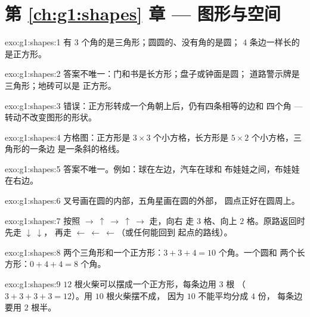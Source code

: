 \section*{第 \ref{ch:g1:shapes} 章 --- 图形与空间}

\begin{solution}{exo:g1:shapes:1}
有 $3$ 个角的是三角形；圆圆的、没有角的是圆；
$4$ 条边一样长的是正方形。
\end{solution}

\begin{solution}{exo:g1:shapes:2}
答案不唯一：门和书是长方形；盘子或钟面是圆；
道路警示牌是三角形；地砖可以是
正方形。
\end{solution}

\begin{solution}{exo:g1:shapes:3}
错误：正方形转成一个角朝上后，仍有四条相等的边和
四个角 --- 转动不改变图形的形状。
\end{solution}

\begin{solution}{exo:g1:shapes:4}
方格图：正方形是 $3 \times 3$ 个小方格，长方形是
$5 \times 2$ 个小方格，三角形的一条边
是一条斜的格线。
\end{solution}

\begin{solution}{exo:g1:shapes:5}
答案不唯一。例如：球在左边，汽车在球和
布娃娃之间，布娃娃在右边。
\end{solution}

\begin{solution}{exo:g1:shapes:6}
叉号画在圆的内部，五角星画在圆的外部，
圆点正好在圆周上。
\end{solution}

\begin{solution}{exo:g1:shapes:7}
按照 $\to\ \uparrow\ \to\ \uparrow\ \to$ 走，向右
走 $3$ 格、向上 $2$ 格。原路返回时先走 $\downarrow\ \downarrow$，
再走 $\leftarrow\ \leftarrow\ \leftarrow$（或任何能回到
起点的路线）。
\end{solution}

\begin{solution}{exo:g1:shapes:8}
两个三角形和一个正方形：$3 + 3 + 4 = 10$ 个角。一个圆和
两个长方形：$0 + 4 + 4 = 8$ 个角。
\end{solution}

\begin{solution}{exo:g1:shapes:9}
$12$ 根火柴可以摆成一个正方形，每条边用 $3$ 根
（$3 + 3 + 3 + 3 = 12$）。用 $10$ 根火柴摆不成，
因为 $10$ 不能平均分成 $4$ 份，
每条边要用 $2$ 根半。
\end{solution}
